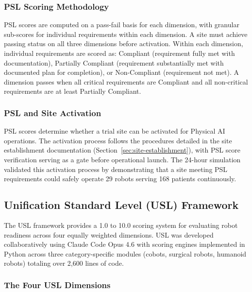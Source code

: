 \subsubsection{PSL Scoring Methodology}

PSL scores are computed on a pass-fail basis for each dimension, with granular
sub-scores for individual requirements within each dimension. A site must
achieve passing status on all three dimensions before activation. Within each
dimension, individual requirements are scored as: Compliant (requirement fully
met with documentation), Partially Compliant (requirement substantially met
with documented plan for completion), or Non-Compliant (requirement not met).
A dimension passes when all critical requirements are Compliant and all
non-critical requirements are at least Partially Compliant.

\subsubsection{PSL and Site Activation}

PSL scores determine whether a trial site can be activated for Physical AI
operations. The activation process follows the procedures detailed in the site
establishment documentation (Section~\ref{sec:site-establishment}), with PSL
score verification serving as a gate before operational launch. The 24-hour
simulation \cite{site-docs} validated this activation process by demonstrating
that a site meeting PSL requirements could safely operate 29 robots serving 168
patients continuously.

\subsection{Unification Standard Level (USL) Framework}
\label{subsec:usl-framework}

The USL framework \cite{usl-standard} provides a 1.0 to 10.0 scoring system
for evaluating robot readiness across four equally weighted dimensions. USL was
developed collaboratively using Claude Code Opus 4.6 \cite{claude-opus} with
scoring engines implemented in Python across three category-specific modules
(cobots, surgical robots, humanoid robots) totaling over 2,600 lines of code.

\clearpage

\subsubsection{The Four USL Dimensions}

